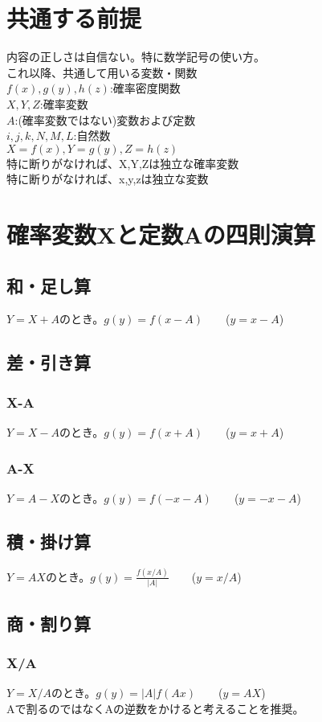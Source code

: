 \documentclass[a4paper,11pt]{ltjsarticle}
\begin{document}
\tableofcontents
\newpage



\section{共通する前提}
内容の正しさは自信ない。特に数学記号の使い方。\\

これ以降、共通して用いる変数・関数\\
$f(x), g(y), h(z)$:確率密度関数\\
$X, Y, Z$:確率変数\\
$A$:(確率変数ではない)変数および定数\\
$i,j,k,N,M,L$:自然数\\
$X=f(x), Y=g(y), Z=h(z)$\\
特に断りがなければ、X,Y,Zは独立な確率変数\\
特に断りがなければ、x,y,zは独立な変数
\newpage


\section{確率変数Xと定数Aの四則演算}
\subsection{和・足し算}
$Y=X+A$のとき。$g(y) = f(x-A)$\ \ \ \ ($y=x-A$)
\subsection{差・引き算}
\subsubsection{X-A}
$Y=X-A$のとき。$g(y) = f(x+A)$\ \ \ \ ($y=x+A$)
\subsubsection{A-X}
$Y=A-X$のとき。$g(y) = f(-x-A)$\ \ \ \ ($y=-x-A$)
\subsection{積・掛け算}
$Y=AX$のとき。$g(y) = \frac{f(x/A)}{\vert A\vert }$\ \ \ \ ($y=x/A$)
\subsection{商・割り算}
\subsubsection{X/A}
$Y=X/A$のとき。$g(y) = \vert A\vert f(Ax)$\ \ \ \ ($y=AX$)\\
Aで割るのではなくAの逆数をかけると考えることを推奨。
\end{document}
